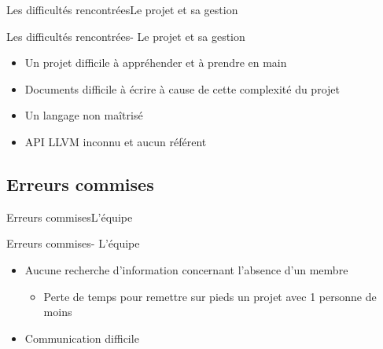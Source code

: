 	    \begin{frame}{Les difficultés rencontrées}{Le projet et sa gestion}
	    	\begin{block}{Les difficultés rencontrées- Le projet et sa gestion}
	    		\begin{itemize}
					\item<1-> Un projet difficile à appréhender et à prendre en main
					\item<2-> Documents difficile à écrire à cause de cette complexité du projet
					\item<3-> Un langage non maîtrisé
					\item<4-> API LLVM inconnu et aucun référent 
	    		\end{itemize}
	    	\end{block}
	    \end{frame}

	\subsection{Erreurs commises}
	    \begin{frame}{Erreurs commises}{L'équipe}
	    	\begin{block}{Erreurs commises- L'équipe}
	    		\begin{itemize}
					\item<1-> Aucune recherche d’information concernant l’absence d’un membre
						\begin{itemize}
							\item<2-> Perte de temps pour remettre sur pieds un projet avec 1 personne de moins
						\end{itemize}
					\item<3-> Communication difficile
	    		\end{itemize}
	    	\end{block}
	    \end{frame}

